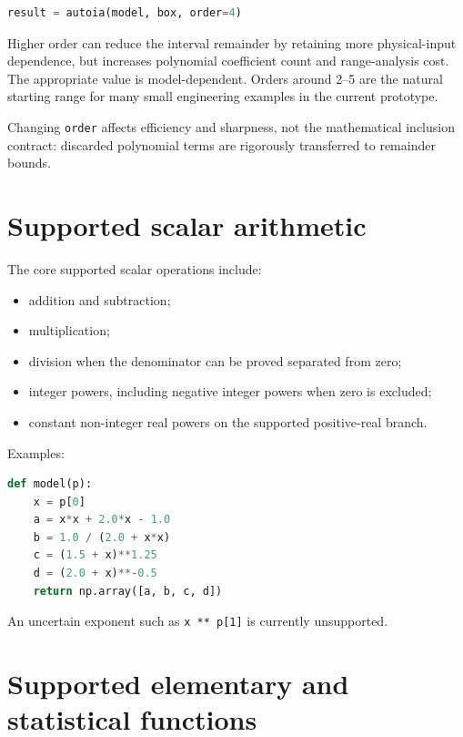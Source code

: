 \documentclass[11pt]{article}
\begin{document}
\begin{lstlisting}[language=Python]
result = autoia(model, box, order=4)
\end{lstlisting}

Higher order can reduce the interval remainder by retaining more physical-input
dependence, but increases polynomial coefficient count and range-analysis cost.
The appropriate value is model-dependent.  Orders around 2--5 are the natural
starting range for many small engineering examples in the current prototype.

Changing \texttt{order} affects efficiency and sharpness, not the mathematical
inclusion contract: discarded polynomial terms are rigorously transferred to
remainder bounds.

\section{Supported scalar arithmetic}

The core supported scalar operations include:
\begin{itemize}[leftmargin=*]
\item addition and subtraction;
\item multiplication;
\item division when the denominator can be proved separated from zero;
\item integer powers, including negative integer powers when zero is excluded;
\item constant non-integer real powers on the supported positive-real branch.
\end{itemize}

Examples:
\begin{lstlisting}[language=Python]
def model(p):
    x = p[0]
    a = x*x + 2.0*x - 1.0
    b = 1.0 / (2.0 + x*x)
    c = (1.5 + x)**1.25
    d = (2.0 + x)**-0.5
    return np.array([a, b, c, d])
\end{lstlisting}

An uncertain exponent such as \texttt{x ** p[1]} is currently unsupported.

\section{Supported elementary and statistical functions}
\end{document}

